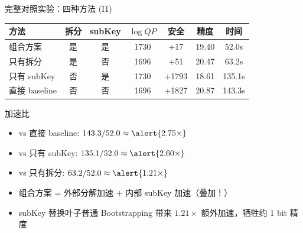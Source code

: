 \documentclass[aspectratio=169, 10pt, xcolor=svgnames, table, UTF8]{ctexbeamer}
\begin{document}
\begin{frame}{完整对照实验：四种方法 (I1)}
  \begin{center}
    \small
    \begin{tabular}{@{}lcccccc@{}}
      \toprule
      方法 & 拆分 & subKey & \(\log QP\) & 安全 & 精度 & 时间 \\
      \midrule
      \alert{组合方案} & \alert{是} & \alert{是} & 1730 & +17 & \alert{19.40} & \alert{52.0s} \\
      只有拆分 & 是 & 否 & 1696 & +51 & 20.47 & 63.2s \\
      只有 subKey & 否 & 是 & 1730 & +1793 & 18.61 & 135.1s \\
      直接 baseline & 否 & 否 & 1696 & +1827 & 20.87 & 143.3s \\
      \bottomrule
    \end{tabular}
  \end{center}
  
  \pause
  
  \begin{block}{加速比}
    \begin{itemize}
      \item vs 直接 baseline: \(143.3 / 52.0 \approx \alert{2.75\times}\)
      \item vs 只有 subKey: \(135.1 / 52.0 \approx \alert{2.60\times}\)
      \item vs 只有拆分: \(63.2 / 52.0 \approx \alert{1.21\times}\)
    \end{itemize}
  \end{block}
  
  \begin{itemize}
    \item 组合方案 = 外部分解加速 \(+\) 内部 subKey 加速（叠加！）
    \item subKey 替换叶子普通 Bootstrapping 带来 \(1.21\times\) 额外加速，牺牲约 1 bit 精度
  \end{itemize}
\end{frame}
\end{document}

